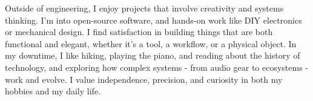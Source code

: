 
Outside of engineering, I enjoy projects that involve creativity and systems thinking.
I'm into open-source software, and hands-on work like DIY electronics or mechanical design.
I find satisfaction in building things that are both functional and elegant, whether it's a tool, a workflow, or a physical object.
In my downtime, I like hiking, playing the piano, and reading about the history of technology, and exploring how complex systems - from audio gear to ecosystems - work and evolve.
I value independence, precision, and curiosity in both my hobbies and my daily life.
